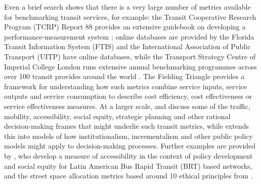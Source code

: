 \documentclass[]{tufte-book}
\begin{document}
Even a brief search shows that there is a very large number of metrics
available for benchmarking transit services, for example: the Transit
Cooperative Research Program (TCRP) Report 88 provides an extensive
guidebook on developing a performance-measurement system
\citep{Ryus:2003aa}; online databases are provided by the Florida
Transit Information System (FTIS)
\citep{Florida-Transit-Information-System:2018aa} and the International
Association of Public Transport (UITP) \citep{UITP:2015aa} have online
databases, while the Transport Strategy Centre of Imperial College
London runs extensive annual benchmarking programmes across over 100
transit provides around the world
\citep{Imperial-College-London:2023aa}. The Fielding Triangle
\citep{FieldingGordonJ1987Mpts} provides a framework for understanding
how such metrics combine service inputs, service outputs and service
consumption to describe cost efficiency, cost effectiveness or service
effectiveness measures. At a larger scale, \citet{Litman:2003ab} and
\citet{Litman:2016aa} discuss some of the traffic, mobility,
accessibility, social equity, strategic planning and other rational
decision-making frames that might underlie such transit metrics, while
\citet{Reynolds:2017ah} extends this into models of how
institutionalism, incrementalism and other public policy models might
apply to decision-making processes. Further examples are provided by
\citet{GuzmanLuisA.2017Aeit}, who develop a measure of accessibility in
the context of policy development and social equity for Latin American
Bus Rapid Transit (BRT) based networks, and the street space allocation
metrics based around 10 ethical principles from
\citet{Creutzig2020streetspaceallocation}.
\end{document}
